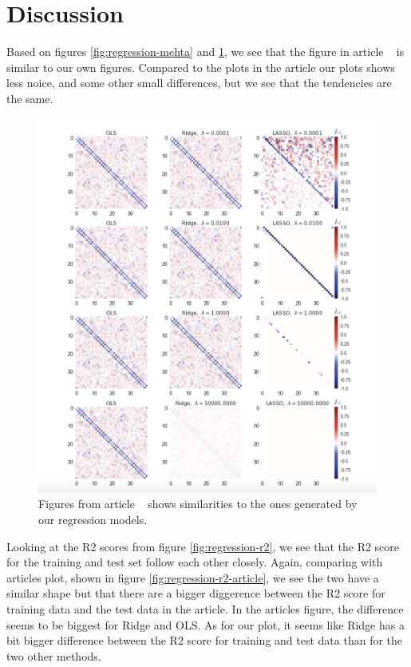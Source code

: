 \section{Discussion}
Based on figures \ref{fig:regression-mehta} and 
\ref{fig:regression-mehta-article}, we see that the figure in article 
~\cite{HighBias} is similar to our own figures. 
Compared to the plots in the article our plots shows less noice, 
and some other small differences, but we see that the tendencies are the same.

\begin{figure}[H]
\includegraphics[width = 0.7\paperwidth]{figures/Regression_metha_article.png} 
\caption{Figures from article ~\cite{HighBias} shows similarities to the ones generated by our regression models.} 
\label{fig:regression-mehta-article}
\end{figure}

Looking at the R2 scores from figure \ref{fig:regression-r2}, we see 
that the R2 score for the training and test set follow each other closely. 
Again, comparing with articles plot, shown in figure 
\ref{fig:regression-r2-article}, we see the two have a similar shape 
but that there are a bigger diggerence between the R2 score for training 
data and the test data in the article. 
In the articles figure, the difference seems to be biggest for Ridge and 
OLS. As for our plot, it seems like Ridge has a bit bigger difference 
between the R2 score for training and test data than for the two other 
methods.

